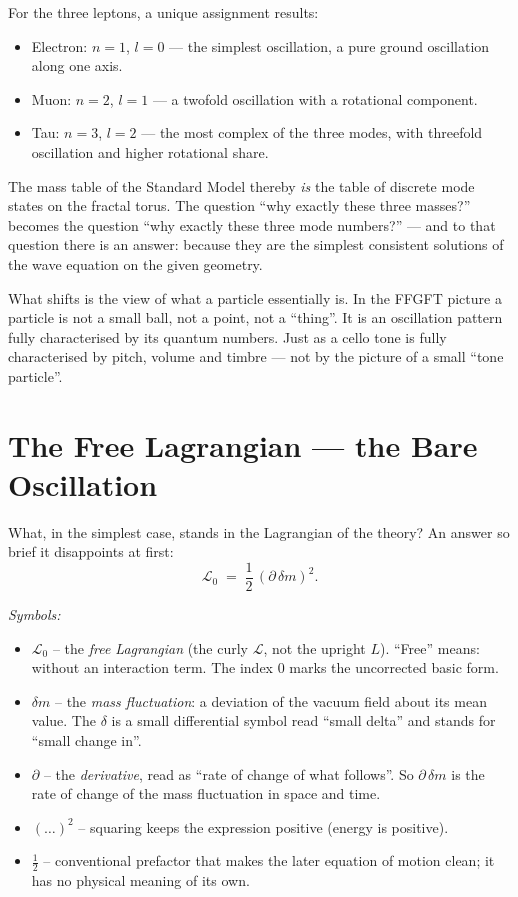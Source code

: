For the three leptons, a unique assignment results:
\begin{itemize}
  \item Electron: $n = 1$, $l = 0$ --- the simplest oscillation, a
        pure ground oscillation along one axis.
  \item Muon: $n = 2$, $l = 1$ --- a twofold oscillation with a
        rotational component.
  \item Tau: $n = 3$, $l = 2$ --- the most complex of the three
        modes, with threefold oscillation and higher rotational
        share.
\end{itemize}
The mass table of the Standard Model thereby \emph{is} the table of
discrete mode states on the fractal torus. The question \enquote{why
exactly these three masses?} becomes the question \enquote{why
exactly these three mode numbers?} --- and to that question there
is an answer: because they are the simplest consistent solutions of
the wave equation on the given geometry.

What shifts is the view of what a particle essentially is. In the
FFGFT picture a particle is not a small ball, not a point, not a
\enquote{thing}. It is an oscillation pattern fully characterised by
its quantum numbers. Just as a cello tone is fully characterised by
pitch, volume and timbre --- not by the picture of a small
\enquote{tone particle}.

\section{The Free Lagrangian --- the Bare Oscillation}

What, in the simplest case, stands in the Lagrangian of the theory?
An answer so brief it disappoints at first:
\[
  \mathcal{L}_0 \;=\; \frac{1}{2}\,(\partial\,\delta m)^2.
\]

\noindent\textit{Symbols:}
\begin{itemize}\setlength\itemsep{0pt}
  \item $\mathcal{L}_0$ -- the \emph{free Lagrangian} (the curly
        $\mathcal{L}$, not the upright $L$). \enquote{Free} means:
        without an interaction term. The index $0$ marks the
        uncorrected basic form.
  \item $\delta m$ -- the \emph{mass fluctuation}: a deviation of the
        vacuum field about its mean value. The $\delta$ is a small
        differential symbol read \enquote{small delta} and stands for
        \enquote{small change in}.
  \item $\partial$ -- the \emph{derivative}, read as \enquote{rate of
        change of what follows}. So $\partial\,\delta m$ is the rate of
        change of the mass fluctuation in space and time.
  \item $(\ldots)^2$ -- squaring keeps the expression positive (energy
        is positive).
  \item $\tfrac{1}{2}$ -- conventional prefactor that makes the later
        equation of motion clean; it has no physical meaning of its own.
\end{itemize}

